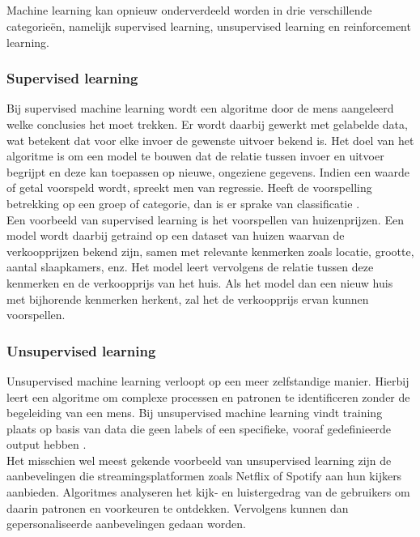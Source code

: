 \subsection{}%
\label{sec:machine learning}

Machine learning kan opnieuw onderverdeeld worden in drie verschillende categorieën, namelijk supervised learning, unsupervised learning en reinforcement learning. 

\subsubsection{Supervised learning}

Bij supervised machine learning wordt een algoritme door de mens aangeleerd welke conclusies het moet trekken. Er wordt daarbij gewerkt met gelabelde data, wat betekent dat voor elke invoer de gewenste uitvoer bekend is. Het doel van het algoritme is om een model te bouwen dat de relatie tussen invoer en uitvoer begrijpt en deze kan toepassen op nieuwe, ongeziene gegevens. Indien een waarde of getal voorspeld wordt, spreekt men van regressie. Heeft de voorspelling betrekking op een groep of categorie, dan is er sprake van classificatie \autocite{Brownlee2023}. \\

Een voorbeeld van supervised learning is het voorspellen van huizenprijzen. Een model wordt daarbij getraind op een dataset van huizen waarvan de verkoopprijzen bekend zijn, samen met relevante kenmerken zoals locatie, grootte, aantal slaapkamers, enz. Het model leert vervolgens de relatie tussen deze kenmerken en de verkoopprijs van het huis. Als het model dan een nieuw huis met bijhorende kenmerken herkent, zal het de verkoopprijs ervan kunnen voorspellen.

\subsubsection{Unsupervised learning}

Unsupervised machine learning verloopt op een meer zelfstandige manier. Hierbij leert een algoritme om complexe processen en patronen te identificeren zonder de begeleiding van een mens. Bij unsupervised machine learning vindt training plaats op basis van data die geen labels of een specifieke, vooraf gedefinieerde output hebben  \autocite{Brownlee2023}. \\

Het misschien wel meest gekende voorbeeld van unsupervised learning zijn de aanbevelingen die streamingsplatformen zoals Netflix of Spotify aan hun kijkers aanbieden. Algoritmes analyseren het kijk- en luistergedrag van de gebruikers om daarin patronen en voorkeuren te ontdekken. Vervolgens kunnen dan gepersonaliseerde aanbevelingen gedaan worden.

